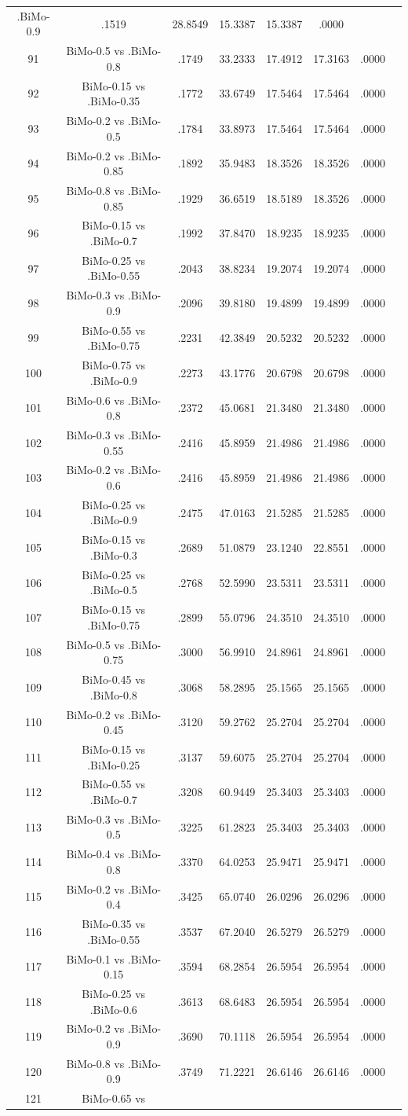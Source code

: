 \documentclass[a4paper,10pt]{article}
\begin{document}
\begin{landscape}
\begin{table}[!htp]
\begin{tabular}{cccccccc}
.BiMo-0.9&.1519&28.8549&15.3387&15.3387&.0000\\91&BiMo-0.5 vs .BiMo-0.8&.1749&33.2333&17.4912&17.3163&.0000\\92&BiMo-0.15 vs .BiMo-0.35&.1772&33.6749&17.5464&17.5464&.0000\\93&BiMo-0.2 vs .BiMo-0.5&.1784&33.8973&17.5464&17.5464&.0000\\94&BiMo-0.2 vs .BiMo-0.85&.1892&35.9483&18.3526&18.3526&.0000\\95&BiMo-0.8 vs .BiMo-0.85&.1929&36.6519&18.5189&18.3526&.0000\\96&BiMo-0.15 vs .BiMo-0.7&.1992&37.8470&18.9235&18.9235&.0000\\97&BiMo-0.25 vs .BiMo-0.55&.2043&38.8234&19.2074&19.2074&.0000\\98&BiMo-0.3 vs .BiMo-0.9&.2096&39.8180&19.4899&19.4899&.0000\\99&BiMo-0.55 vs .BiMo-0.75&.2231&42.3849&20.5232&20.5232&.0000\\100&BiMo-0.75 vs .BiMo-0.9&.2273&43.1776&20.6798&20.6798&.0000\\101&BiMo-0.6 vs .BiMo-0.8&.2372&45.0681&21.3480&21.3480&.0000\\102&BiMo-0.3 vs .BiMo-0.55&.2416&45.8959&21.4986&21.4986&.0000\\103&BiMo-0.2 vs .BiMo-0.6&.2416&45.8959&21.4986&21.4986&.0000\\104&BiMo-0.25 vs .BiMo-0.9&.2475&47.0163&21.5285&21.5285&.0000\\105&BiMo-0.15 vs .BiMo-0.3&.2689&51.0879&23.1240&22.8551&.0000\\106&BiMo-0.25 vs .BiMo-0.5&.2768&52.5990&23.5311&23.5311&.0000\\107&BiMo-0.15 vs .BiMo-0.75&.2899&55.0796&24.3510&24.3510&.0000\\108&BiMo-0.5 vs .BiMo-0.75&.3000&56.9910&24.8961&24.8961&.0000\\109&BiMo-0.45 vs .BiMo-0.8&.3068&58.2895&25.1565&25.1565&.0000\\110&BiMo-0.2 vs .BiMo-0.45&.3120&59.2762&25.2704&25.2704&.0000\\111&BiMo-0.15 vs .BiMo-0.25&.3137&59.6075&25.2704&25.2704&.0000\\112&BiMo-0.55 vs .BiMo-0.7&.3208&60.9449&25.3403&25.3403&.0000\\113&BiMo-0.3 vs .BiMo-0.5&.3225&61.2823&25.3403&25.3403&.0000\\114&BiMo-0.4 vs .BiMo-0.8&.3370&64.0253&25.9471&25.9471&.0000\\115&BiMo-0.2 vs .BiMo-0.4&.3425&65.0740&26.0296&26.0296&.0000\\116&BiMo-0.35 vs .BiMo-0.55&.3537&67.2040&26.5279&26.5279&.0000\\117&BiMo-0.1 vs .BiMo-0.15&.3594&68.2854&26.5954&26.5954&.0000\\118&BiMo-0.25 vs .BiMo-0.6&.3613&68.6483&26.5954&26.5954&.0000\\119&BiMo-0.2 vs .BiMo-0.9&.3690&70.1118&26.5954&26.5954&.0000\\120&BiMo-0.8 vs .BiMo-0.9&.3749&71.2221&26.6146&26.6146&.0000\\121&BiMo-0.65 vs 
\end{tabular}
\end{table}
\end{landscape}
\end{document}
